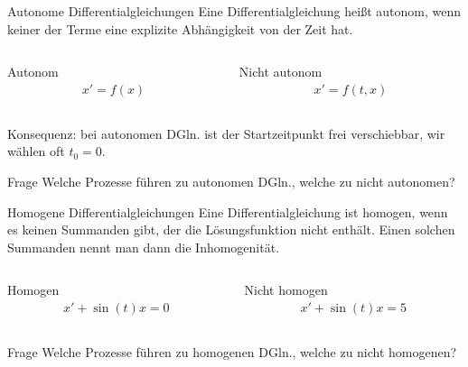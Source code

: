 \begin{frame}
  \begin{block}{Autonome Differentialgleichungen}
    Eine Differentialgleichung heißt autonom, wenn keiner der Terme
    eine explizite Abhängigkeit von der Zeit hat.
  \end{block}
  \begin{columns}
    \begin{column}[t]{.5\textwidth}
      \begin{block}{Autonom}
        \begin{gather*}
          x' = f(x)
        \end{gather*}
      \end{block}
    \end{column}
    \begin{column}[t]{.5\textwidth}
      \begin{block}{Nicht autonom}
        \begin{gather*}
          x' = f(t,x)
        \end{gather*}
      \end{block}
    \end{column}
  \end{columns}
  \pause Konsequenz: bei autonomen DGln. ist der Startzeitpunkt frei
  verschiebbar, wir wählen oft $t_0 = 0$.
  \begin{exampleblock}{Frage}
    Welche Prozesse führen zu autonomen DGln., welche zu nicht autonomen?
  \end{exampleblock}
\end{frame}

\begin{frame}
  \begin{block}{Homogene Differentialgleichungen}
    Eine Differentialgleichung ist homogen, wenn es keinen Summanden
    gibt, der die Lösungsfunktion nicht enthält. Einen solchen
    Summanden nennt man dann die Inhomogenität.
  \end{block}
  \begin{columns}
    \begin{column}[t]{.5\textwidth}
      \begin{block}{Homogen}
        \begin{gather*}
          x'+ \sin(t) x = 0
        \end{gather*}
      \end{block}
    \end{column}
    \begin{column}[t]{.5\textwidth}
      \begin{block}{Nicht homogen}
        \begin{gather*}
          x'+ \sin(t) x = 5
        \end{gather*}
      \end{block}
    \end{column}
  \end{columns}
  \begin{exampleblock}{Frage}
    Welche Prozesse führen zu homogenen DGln., welche zu nicht homogenen?
  \end{exampleblock}
\end{frame}

